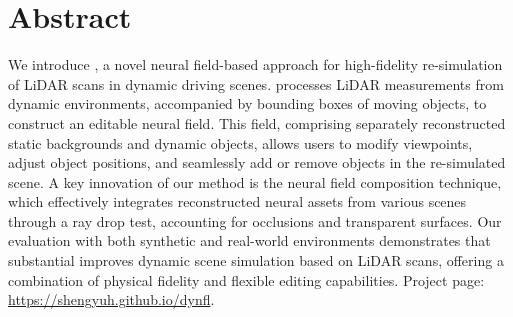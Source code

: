 \section*{Abstract}
We introduce \dynfl, a novel neural field-based approach for high-fidelity re-simulation of LiDAR scans in dynamic driving scenes. \dynfl processes LiDAR measurements from dynamic environments, accompanied by bounding boxes of moving objects, to construct an editable neural field. This field, comprising separately reconstructed static backgrounds and dynamic objects, allows users to modify viewpoints, adjust object positions, and seamlessly add or remove objects in the re-simulated scene.
%
A key innovation of our method is the neural field composition technique, which effectively integrates reconstructed neural assets from various scenes through a ray drop test, accounting for occlusions and transparent surfaces.
Our evaluation with both synthetic and real-world environments demonstrates that \dynfl substantial improves dynamic scene simulation based on LiDAR scans, offering a combination of physical fidelity and flexible editing capabilities. Project page: \url{https://shengyuh.github.io/dynfl}.